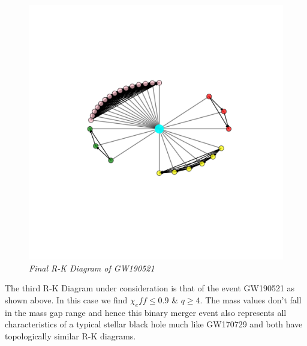     \begin{figure}[H]
        \centering
        \includegraphics[width=1.0\linewidth]{images/GW190521_RK_Diagram.png}
        \caption{\textit{Final R-K Diagram of GW190521}}
        \label{fig:LIGO14_PlaceHolder3_fig}
    \end{figure}

The third R-K Diagram under consideration is that of the event GW190521 as shown above. In this case we find $\chi_eff \le 0.9$ \&  $q\ge 4$. The mass values don't fall in the mass gap range and hence this binary merger event also represents all characteristics of a typical stellar black hole much like GW170729 and both have topologically similar R-K diagrams.


